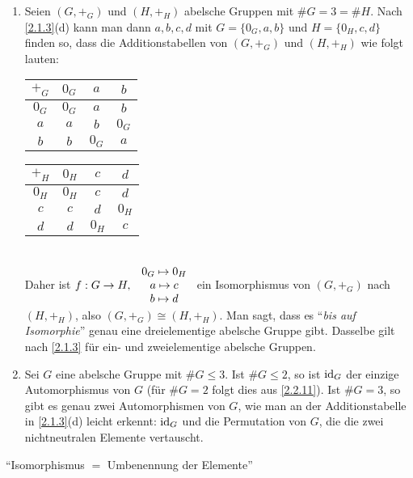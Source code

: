 \documentclass[../../main.tex]{subfiles}
\begin{document}
\begin{bsp}\label{2.2.16}
\begin{enumerate}[\normalfont(a)]
\item Seien $(G,+_G)$ und $(H,+_H)$ abelsche Gruppen mit $\# G = 3 = \# H$. Nach \ref{2.1.3}(d) kann man dann
 $a,b,c,d$ mit $G=\{0_G,a,b\}$ und $H=\{0_H,c,d\}$ finden so, dass die Additionstabellen von $(G,+_G)$ und $(H,+_H)$
 wie folgt lauten:
\begin{table}[h!]
\centering
\begin{tabular}{c|ccc}
$+_G$ & $0_G$ & $a$ & $b$ \\\hline
$0_G$ & $0_G$ & $a$ & $b$ \\
$a$ & $a$ & $b$ & $0_G$ \\
$b$ & $b$ & $0_G$ & $a$
\end{tabular}
\qquad{}\qquad
\begin{tabular}{c|ccc}
$+_H$ & $0_H$ & $c$ & $d$ \\\hline 
$0_H$ & $0_H$ & $c$ & $d$ \\ 
$c$ & $c$ & $d$ & $0_H$ \\
$d$ & $d$ & $0_H$ & $c$
\end{tabular} 
\end{table}\\
Daher ist $f:G\rightarrow H,\ \begin{array}[c]{c}0_G\mapsto 0_H\\a\mapsto c\\b\mapsto d\end{array}$ ein Isomorphismus von
$(G,+_G)$ nach $(H,+_H)$, also $(G,+_G)\cong(H,+_H)$.
Man sagt, dass es "`\emph{bis auf Isomorphie}"' genau eine dreielementige abelsche Gruppe gibt.
Dasselbe gilt nach \ref{2.1.3} für ein- und zweielementige abelsche Gruppen.
\item Sei $G$ eine abelsche Gruppe mit $\#G\le3$. Ist $\#G\le2$, so ist $\operatorname{id}_G$ der einzige Automorphismus von $G$
(für $\#G=2$ folgt dies aus \ref{2.2.11}). Ist $\#G=3$, so gibt es genau zwei Automorphismen von $G$, wie man an der
Additionstabelle in \ref{2.1.3}(d) leicht erkennt: $\operatorname{id}_G$ und die Permutation von $G$, die die zwei nichtneutralen Elemente vertauscht.
\end{enumerate}
\end{bsp}

\begin{spr}\label{2.2.17}
"`Isomorphismus $=$ Umbenennung der Elemente"'
\end{spr}
\end{document}
